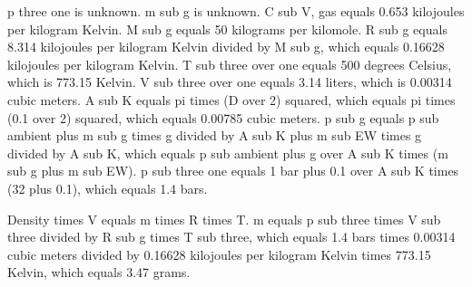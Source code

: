 p three one is unknown.
m sub g is unknown.
C sub V, gas equals 0.653 kilojoules per kilogram Kelvin.
M sub g equals 50 kilograms per kilomole.
R sub g equals 8.314 kilojoules per kilogram Kelvin divided by M sub g, which equals 0.16628 kilojoules per kilogram Kelvin.
T sub three over one equals 500 degrees Celsius, which is 773.15 Kelvin.
V sub three over one equals 3.14 liters, which is 0.00314 cubic meters.
A sub K equals pi times (D over 2) squared, which equals pi times (0.1 over 2) squared, which equals 0.00785 cubic meters.
p sub g equals p sub ambient plus m sub g times g divided by A sub K plus m sub EW times g divided by A sub K, which equals p sub ambient plus g over A sub K times (m sub g plus m sub EW).
p sub three one equals 1 bar plus 0.1 over A sub K times (32 plus 0.1), which equals 1.4 bars.

Density times V equals m times R times T.
m equals p sub three times V sub three divided by R sub g times T sub three, which equals 1.4 bars times 0.00314 cubic meters divided by 0.16628 kilojoules per kilogram Kelvin times 773.15 Kelvin, which equals 3.47 grams.